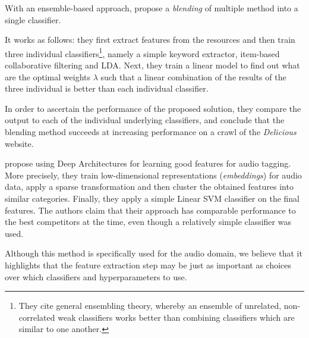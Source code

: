 With an ensemble-based approach, \cite{liu_etal_2013} propose a \textit{blending} of multiple method into a single classifier. 

It works as follows: they first extract features from the resources and then train three individual classifiers\footnote{They cite general ensembling theory, whereby an ensemble of unrelated, non-correlated weak classifiers works better than combining classifiers which are similar to one another.}, namely a simple keyword extractor, item-based collaborative filtering and LDA. Next, they train a linear model to find out what are the optimal weights $\lambda$ such that a linear combination of the results of the three individual is better than each individual classifier.

In order to ascertain the performance of the proposed solution, they compare the output to each of the individual underlying classifiers, and conclude that the blending method succeeds at increasing performance on a crawl of the \textit{Delicious} website.

\cite{sattigeri_etal_2014} propose using Deep Architectures for learning good features for audio tagging. More precisely, they train low-dimensional representations (\textit{embeddings}) for audio data, apply a sparse transformation and then cluster the obtained features into similar categories. Finally, they apply a simple Linear SVM classifier on the final features. The authors claim that their approach has comparable performance to the best competitors at the time, even though a relatively simple classifier was used.

Although this method is specifically used for the audio domain, we believe that it highlights that the feature extraction step may be just as important as choices over which classifiers and hyperparameters to use.